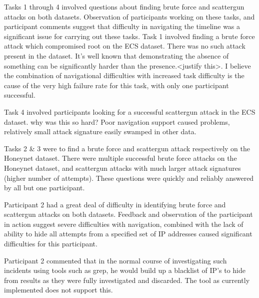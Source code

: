 Tasks 1 through 4 involved questions about finding brute force and scattergun attacks on both datasets. Observation of participants working on these tasks, and participant comments suggest that difficulty in navigating the timeline was a significant issue for carrying out these tasks.
Task 1 involved finding a brute force attack which compromised root on the ECS dataset. There was no such attack present in the dataset. It's well known that demonstrating the absence of something can be significantly harder than the presence.<justify this>. I believe the combination of navigational difficulties with increased task difficulty is the cause of the very high failure rate for this task, with only one participant successful.

Task 4 involved participants looking for a successful scattergun attack in the ECS dataset. why was this so hard? Poor navigation support caused problems, relatively small attack signature easily swamped in other data.

Tasks 2 \& 3 were to find a brute force and scattergun attack respectively on the Honeynet dataset.
There were multiple successful brute force attacks on the Honeynet dataset, and scattergun attacks with much larger attack signatures (higher number of attempts). These questions were quickly and reliably answered by all but one participant.

Participant 2 had a great deal of difficulty in identifying brute force and scattergun attacks on both datasets. Feedback and observation of the participant in action suggest severe difficulties with navigation, combined with the lack of ability to hide all attempts from a specified set of IP addresses caused significant difficulties for this participant.

Participant 2 commented that in the normal course of investigating such incidents using tools such as grep, he would build up a blacklist of IP's to hide from results as they were fully investigated and discarded.
The tool as currently implemented does not support this. 

